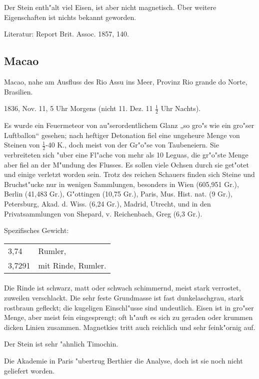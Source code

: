 \documentclass[a4paper, 11pt, oneside]{article}
\begin{document}
Der Stein enth"alt viel Eisen, ist aber nicht magnetisch. Über weitere Eigenschaften ist nichts bekannt geworden.

Literatur: Report Brit. Assoc. 1857, 140.

\subsection{Macao}

Macao, nahe am Ausfluss des Rio Assu ins Meer, Provinz Rio grande do Norte, Brasilien.

1836, Nov. 11, 5 Uhr Morgens (nicht 11. Dez. 11 $\frac{1}{2}$ Uhr Nachts).

Es wurde ein Feuermeteor von au"serordentlichem Glanz „so gro"s wie ein gro"ser Luftballon“ gesehen; nach heftiger Detonation fiel eine ungeheure Menge von Steinen von $\frac{1}{2}$-40 K., doch meist von der Gr"o"se von Taubeneiern. Sie verbreiteten sich "uber eine Fl"ache von mehr als 10 Leguas, die gr"o"ste Menge aber fiel an der M"undung des Flusses. Es sollen viele Ochsen durch sie get"otet und einige verletzt worden sein. Trotz des reichen Schauers finden sich Steine und Bruchst"ucke nur in wenigen Sammlungen, besonders in Wien (605,951 Gr.), Berlin (41,483 Gr.), G"ottingen (10,75 Gr.), Paris, Mus. Hist. nat. (9 Gr.), Petersburg, Akad. d. Wiss. (6,24 Gr.), Madrid, Utrecht, und in den Privatsammlungen von Shepard, v. Reichenbach, Greg (6,3 Gr.).

Spezifisches Gewicht:  
\begin{table}[!ht]
    \centering
    \begin{tabular}{l l}
        3,74 & Rumler,\\
        3,7291 & mit Rinde, Rumler.
    \end{tabular}
\end{table}
\paragraph{}
Die Rinde ist schwarz, matt oder schwach schimmernd, meist stark verrostet, zuweilen verschlackt. Die sehr feste Grundmasse ist fast dunkelaschgrau, stark rostbraun gefleckt; die kugeligen Einschl"usse sind undeutlich. Eisen ist in gro"ser Menge, aber meist fein eingesprengt; oft h"auft es sich zu geraden oder krummen dicken Linien zusammen. Magnetkies tritt auch reichlich und sehr feink"ornig auf.

Der Stein ist sehr "ahnlich Timochin.

Die Akademie in Paris "ubertrug Berthier die Analyse, doch ist sie noch nicht geliefert worden.
\end{document}
